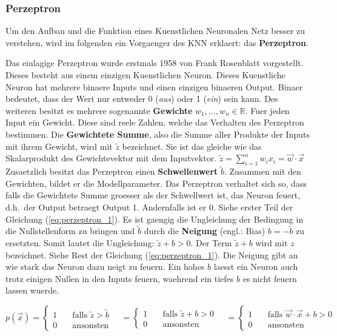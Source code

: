 \documentclass[../main]{subfiles}
\begin{document}
\subsubsection{Perzeptron}
Um den Aufbau und die Funktion eines Kuenstlichen Neuronalen Netz besser zu
verstehen, wird im folgenden ein Vorgaenger des KNN erklaert: das \textbf{Perzeptron}.
\par\medskip
Das einlagige Perzeptron wurde erstmals 1958 von Frank Rosenblatt vorgestellt. Dieses
besteht aus einem einzigen Kuenstlichen Neuron. Dieses Kuenstliche Neuron
hat mehrere binaere Inputs und einen einzigen binaeren Output. Binaer
bedeutet, dass der Wert nur entweder 0 (\textit{aus}) oder 1 (\textit{ein}) sein
kann. Des weiteren besitzt es mehrere sogenannte \textbf{Gewichte} $w_1, \ldots,
w_n \in \mathbb{R}$. Fuer jeden Input ein Gewicht.
Diese sind reele Zahlen, welche das Verhalten des Perzeptron bestimmen.
Die \textbf{Gewichtete Summe}, also die Summe aller Produkte der Inputs mit
ihrem Gewicht, wird mit $\tilde{z}$ bezeichnet.
Sie ist das gleiche wie das Skalarprodukt des Gewichtevektor mit dem Inputvektor.
$\displaystyle \tilde{z} = \sum_{i=1}^{n} w_i x_i = \vec{w} \cdot \vec{x}$\\
Zusaetzlich besitzt das Perzeptron einen \textbf{Schwellenwert} $\tilde{b}$.
Zusammen mit den Gewichten, bildet er die Modellparameter.
Das Perzeptron verhaltet sich so, dass falls die Gewichtete Summe groesser als der
Schwellwert ist, das Neuron feuert, d.h.\ der Output betraegt Output 1. Andernfalls ist er 0.
Siehe erster Teil der Gleichung (\ref{eq:perzeptron_1}).
Es ist gaengig die Ungleichung der Bedingung in die Nullstellenform zu bringen
und $\tilde{b}$ durch die \textbf{Neigung} (engl.: Bias)
$b = -\tilde{b}$ zu ersetzten. Somit lautet die Ungleichung: $\tilde{z} + b
> 0$. Der Term $\tilde{z} + b$ wird mit $z$ bezeichnet. Siehe Rest der Gleichung (\ref{eq:perzeptron_1}).
Die Neigung gibt an wie stark das Neuron dazu neigt zu feuern. Ein hohes $b$
laesst ein Neuron auch trotz einigen Nullen in den Inputs feuern, waehrend ein
tiefes $b$ es nicht feuern lassen wuerde.

\begin{equation}\label{eq:perzeptron_1}
  p(\vec{x}) =
  \begin{cases}
    1 & \quad \text{falls } \tilde{z} > \tilde{b}\\
    0 & \quad \text{ansonsten}
  \end{cases}
  \quad =
  \begin{cases}
    1 & \quad \text{falls } \tilde{z} + b > 0\\
    0 & \quad \text{ansonsten}
  \end{cases}
  \quad =
  \begin{cases}
    1 & \quad\text{falls } \vec{w} \cdot \vec{x} + b > 0\\
    0 & \quad\text{ansonsten}
  \end{cases}
\end{equation}
\end{document}
